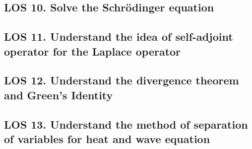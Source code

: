 \documentclass[12pt, a4paper]{article}
\begin{document}
\subsection*{LOS 10. Solve the Schrödinger equation}
\vspace{0.3em}

\subsection*{LOS 11. Understand the idea of self-adjoint operator for the Laplace operator}
\vspace{0.3em}

\subsection*{LOS 12. Understand the divergence theorem and Green's Identity}
\vspace{0.3em}

\subsection*{LOS 13. Understand the method of separation of variables for heat and wave equation}
\vspace{0.3em}
\end{document}
